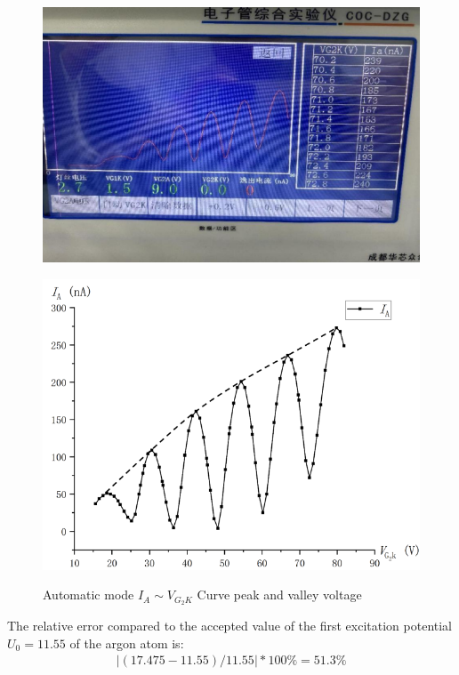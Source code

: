 \documentclass[UTF8]{article}
\begin{document}
\begin{figure}[H]
   \begin{minipage}[t]{0.5\linewidth}
      \centering
      \includegraphics[clip,scale=1,trim={0 0 0 0}]{fig/fig9.png}
      \label{figure.9}
   \end{minipage}
   \begin{minipage}[t]{0.5\linewidth}
      \centering
      \includegraphics[clip,scale=0.8,trim={0 0 0 0}]{fig/fig10.png}
      \label{figure.10}
   \end{minipage}
   	  \caption{Automatic mode $I_A\sim V_{G_2K}$ Curve peak and valley voltage}
\end{figure} 

The relative error compared to the accepted value of the first excitation potential$U_0 = 11.55$ of the argon atom is:
\begin{eqnarray}
\left | (17.475-11.55)/11.55 \right | *100\% = 51.3\%
\end{eqnarray}
\end{document}
